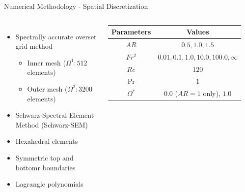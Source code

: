 \documentclass[aspectratio=169,xcolor=dvipsnames]{beamer}
\newcommand\Rey{\mathit{Re}}
\begin{document}
\begin{frame}{Numerical Methodology - Spatial Discretization}
    \begin{columns}[c]
        \begin{itemize}
            \item Spectrally accurate overset grid method 
            \begin{itemize} 
                \item Inner mesh ($\Omega^{1}: 512$ elements)
                \item Outer mesh ($\Omega^{2}: 3200$ elements)
            \end{itemize}
            \item Schwarz-Spectral Element Method (Schwarz-SEM)
            \item Hexahedral elements
            \item Symmetric top and bottomr boundaries
            \item Lagrangle polynomials
            
            
        \end{itemize}
      
        \begin{table}
            \centering
            \begin{tabular}{c|c}
              Parameters      & Values   \\ \hline
              $AR$   & $0.5, 1.0, 1.5$ \\
              $Fr^2$ & $0.01, 0.1, 1.0, 10.0, 100.0, \infty$     \\
              $\Rey$ & $120$  \\
              $\Pr$ & $1$  \\
              $\Omega^{\ast}$ & $0.0$ ($AR = 1$ only), $1.0$  \\
            \end{tabular}
            \label{table:parameter_space}
        \end{table}
        

\end{columns}
\end{frame}
\end{document}
